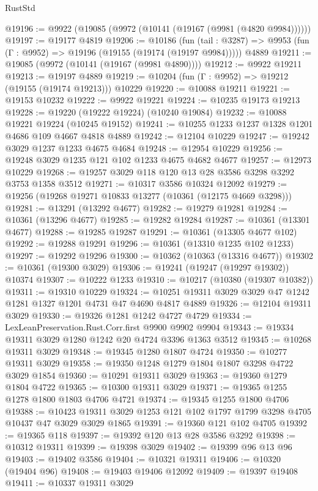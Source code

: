 \begin{lexlean}{RustStd}
\begin{coremodule}
@19196 := @9922 (@19085 (@9972 (@10141 (@19167 (@9981 (@4820 @9984))))))
@19197 := @19177 @4819
@19206 := @10186
    (fun (tail : @3287) => @9953 (fun (Γ : @9952) => @19196 (@19155 (@19174 (@19197 @9984)))))
    @4889
@19211 := @19085 (@9972 (@10141 (@19167 (@9981 @4890))))
@19212 := @9922 @19211
@19213 := @19197 @4889
@19219 := @10204 (fun (Γ : @9952) => @19212 (@19155 (@19174 @19213))) @10229
@19220 := @10088 @19211
@19221 := @19153 @10232
@19222 := @9922 @19221
@19224 := @10235 @19173 @19213
@19228 := @19220 (@19222 @19224) (@10240 @19084)
@19232 := @10088 @19221 @19224 (@10245 @19152)
@19241 := @10255 @1233 @1237 @1328 @1201 @4686 @109 @4667 @4818 @4889
@19242 := @12104 @10229
@19247 := @19242 @3029 @1237 @1233 @4675 @4684
@19248 := @12954 @10229
@19256 := @19248 @3029 @1235 @121 @102 @1233 @4675 @4682 @4677
@19257 := @12973 @10229
@19268 := @19257 @3029 @118 @120 @13 @28 @3586 @3298 @3292 @3753 @1358 @3512
@19271 := @10317 @3586 @10324 @12092
@19279 := @19256 (@19268 @19271 @10833 @13277 (@10361 (@12175 @4669 @3298)))
@19281 := @13291 (@13292 @4677)
@19282 := @19279 @19281
@19284 := @10361 (@13296 @4677)
@19285 := @19282 @19284
@19287 := @10361 (@13301 @4677)
@19288 := @19285 @19287
@19291 := @10361 (@13305 @4677 @102)
@19292 := @19288 @19291
@19296 := @10361 (@13310 @1235 @102 @1233)
@19297 := @19292 @19296
@19300 := @10362 (@10363 (@13316 @4677))
@19302 := @10361 (@19300 @3029)
@19306 := @19241 (@19247 (@19297 @19302)) @10374
@19307 := @10222 @1233
@19310 := @10217 (@10380 (@19307 @10382))
@19311 := @19310 @10229
@19324 := @10251 @19311 @3029 @3029 @47 @1242 @1281 @1327 @1201 @4731 @47 @4690 @4817 @4889
@19326 := @12104 @19311 @3029
@19330 := @19326 @1281 @1242 @4727 @4729
@19334 := LexLeanPreservation.Rust.Corr.first @9900 @9902 @9904
@19343 := @19334 @19311 @3029 @1280 @1242 @20 @4724 @3396 @1363 @3512
@19345 := @10268 @19311 @3029
@19348 := @19345 @1280 @1807 @4724
@19350 := @10277 @19311 @3029
@19358 := @19350 @1248 @1279 @1804 @1807 @3298 @4722 @3029 @1854
@19360 := @10291 @19311 @3029
@19363 := @19360 @1279 @1804 @4722
@19365 := @10300 @19311 @3029
@19371 := @19365 @1255 @1278 @1800 @1803 @4706 @4721
@19374 := @19345 @1255 @1800 @4706
@19388 := @10423 @19311 @3029 @1253 @121 @102 @1797 @1799 @3298 @4705 @10437 @47 @3029 @3029 @1865
@19391 := @19360 @121 @102 @4705
@19392 := @19365 @118
@19397 := @19392 @120 @13 @28 @3586 @3292
@19398 := @10312 @19311
@19399 := @19398 @3029
@19402 := @19399 @96 @13 @96
@19403 := @19402 @3586
@19404 := @10321 @19311
@19406 := @10320 (@19404 @96)
@19408 := @19403 @19406 @12092
@19409 := @19397 @19408
@19411 := @10337 @19311 @3029

\end{coremodule}
\end{lexlean}
